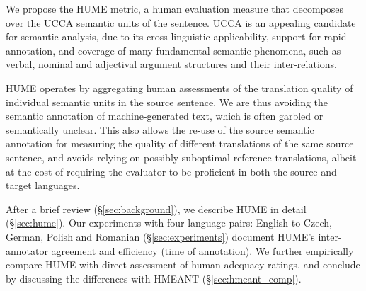 \documentclass[11pt,letterpaper]{article}
\newcommand{\secref}[1]{\S\ref{#1}}
\newcommand{\XXX}[1]{{\color{red}XXX #1}} %
\newcommand{\bh}[1]{\footnote{\color{blue}BH: #1}}
\def\parcite#1{\cite{#1}}
\begin{document}

We propose the HUME metric,
a human evaluation measure that decomposes over the UCCA semantic units of the sentence.
UCCA \parcite{abend2013universal} is an appealing candidate for semantic analysis,
due to its cross-linguistic applicability, support for rapid annotation, and coverage
of many fundamental semantic phenomena, such as verbal, nominal and adjectival
argument structures and their inter-relations.

HUME operates by aggregating human assessments of the translation quality of individual
semantic units in the source sentence. We 
are thus avoiding the semantic annotation of machine-generated text,
which is often garbled or semantically unclear.
This also allows the re-use of the source semantic annotation for
measuring the quality of different translations of the same source sentence,
and 
avoids relying on possibly suboptimal reference translations,
albeit at the cost of requiring the
evaluator to be proficient in both the source and target languages.

After a brief review (\secref{sec:background}), we describe HUME in detail
(\secref{sec:hume}).
Our experiments with four language pairs: English to Czech, German, Polish and Romanian (\secref{sec:experiments})
document HUME's inter-annotator agreement and efficiency (time of annotation). 
We further empirically compare HUME with direct assessment of human adequacy ratings,
and conclude by discussing the differences with HMEANT (\secref{sec:hmeant_comp}).

% 
\end{document}
